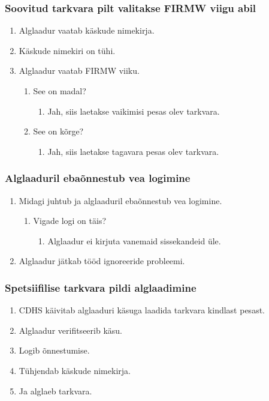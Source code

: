 \documentclass[12pt,a4paper]{article}
\begin{document}
\subsubsection{Soovitud tarkvara pilt valitakse FIRMW viigu abil}
\begin{enumerate}
	\item Alglaadur vaatab käskude nimekirja.
	\item Käskude nimekiri on tühi.
	\item Alglaadur vaatab FIRMW viiku.
		\begin{enumerate}
			\item See on madal?
				\begin{enumerate}
					\item Jah, siis laetakse vaikimisi pesas olev tarkvara.
				\end{enumerate}
			\item See on kõrge?
				\begin{enumerate}
					\item Jah, siis laetakse tagavara pesas olev tarkvara.
				\end{enumerate}
		\end{enumerate}
\end{enumerate}

\subsubsection{Alglaaduril ebaõnnestub vea logimine}
\begin{enumerate}
	\item Midagi juhtub ja alglaaduril ebaõnnestub vea logimine.
		\begin{enumerate}
			\item Vigade logi on täis?
				\begin{enumerate}
					\item Alglaadur ei kirjuta vanemaid sissekandeid üle.
				\end{enumerate}
		\end{enumerate}
	\item Alglaadur jätkab tööd ignoreeride probleemi.
\end{enumerate}

\subsubsection{Spetsiifilise tarkvara pildi alglaadimine}
\begin{enumerate}
	\item CDHS käivitab alglaaduri käsuga laadida tarkvara kindlast pesast.
	\item Alglaadur verifitseerib käsu.
	\item Logib õnnestumise.
	\item Tühjendab käskude nimekirja.
	\item Ja alglaeb tarkvara.
\end{enumerate}
\end{document}

